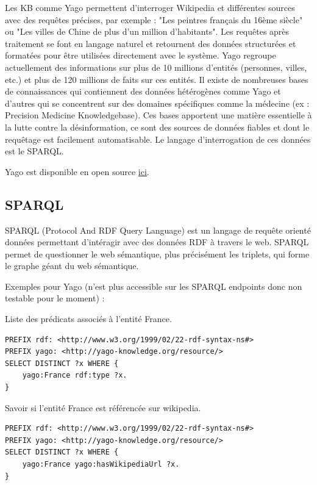 Les KB comme Yago permettent d'interroger Wikipedia et différentes sources avec des requêtes précises, par exemple : "Les peintres français du 16ème siècle" ou "Les villes de Chine de plus d'un million d'habitants". Les requêtes après traitement se font en langage naturel et retournent des données structurées et formatées pour être utilisées directement avec le système. Yago regroupe actuellement des informations sur plus de 10 millions d'entités (personnes, villes, etc.) et plus de 120 millions de faits sur ces entités. 
Il existe de nombreuses bases de connaissances qui contiennent des données hétérogènes comme Yago et d'autres qui se concentrent sur des domaines spécifiques comme la médecine (ex : Precision Medicine Knowledgebase). Ces bases apportent une matière essentielle à la lutte contre la désinformation, ce sont des sources de données fiables et dont le requêtage est facilement automatisable.
Le langage d'interrogation de ces données est le SPARQL.

Yago est disponible en open source \href{https://github.com/yago-naga/yago3}{ici}.

\iffalse
\subsection{SPARQL}

SPARQL (Protocol And RDF Query Language) est un langage de requête orienté données permettant d'intéragir avec des données RDF à travers le web. SPARQL permet de questionner le web sémantique, plus précisément les triplets, qui forme le graphe géant du web sémantique.

Exemples pour Yago (n'est plus accessible sur les SPARQL endpoints donc non testable pour le moment) :

Liste des prédicats associés à l'entité France.

\begin{lstlisting}[language=SPARQL, backgroundcolor=\color{lightgray}]
PREFIX rdf: <http://www.w3.org/1999/02/22-rdf-syntax-ns#> 
PREFIX yago: <http://yago-knowledge.org/resource/>
SELECT DISTINCT ?x WHERE {
    yago:France rdf:type ?x.
}
\end{lstlisting}

\iffalse
Savoir si l'entité France est référencée sur wikipedia.

\begin{lstlisting}[language=SPARQL, backgroundcolor=\color{lightgray}]
PREFIX rdf: <http://www.w3.org/1999/02/22-rdf-syntax-ns#> 
PREFIX yago: <http://yago-knowledge.org/resource/>
SELECT DISTINCT ?x WHERE {
    yago:France yago:hasWikipediaUrl ?x.
}
\end{lstlisting}

